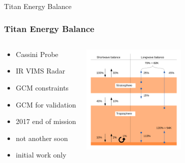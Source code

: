 \documentclass[serif,mathserif]{beamer}
\begin{document}

{
\begin{frame}[plain]
\begin{shaded}
Titan Energy Balance
\end{shaded}
\end{frame}}


\begin{frame}
  \frametitle{Titan Energy Balance}
\begin{columns}
\begin{center}
\begin{itemize}
 \item Cassini Probe
 \item IR VIMS Radar
 \item GCM constraints
 \item GCM for validation
 \item 2017 end of mission
 \item not another soon
 \item initial work only
\end{itemize}
\end{center}

\begin{center}
 \includegraphics[width=5cm]{energybalance}
\end{center}
\end{columns}
\end{frame}
\end{document}

